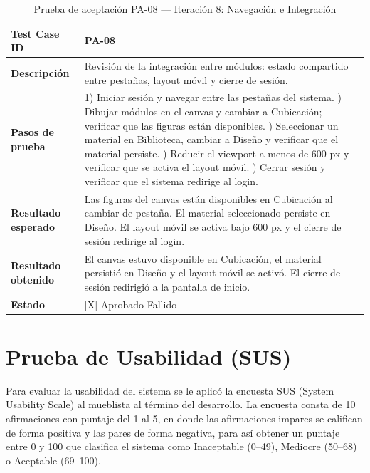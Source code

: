 ﻿\documentclass{iccmemoria}
\begin{document}
\begin{table}[H]
\centering
\caption{Prueba de aceptación PA-08 — Iteración 8: Navegación e Integración}
\label{tab:pa08}
\begin{tabular}{|p{4cm}|p{9.5cm}|}
\hline
\textbf{Test Case ID} & PA-08 \\
\hline
\textbf{Descripción} & Revisión de la integración entre módulos: estado compartido entre pestañas, layout móvil y cierre de sesión. \\
\hline
\textbf{Pasos de prueba} &
1) Iniciar sesión y navegar entre las pestañas del sistema. \newline
2) Dibujar módulos en el canvas y cambiar a Cubicación; verificar que las figuras están disponibles. \newline
3) Seleccionar un material en Biblioteca, cambiar a Diseño y verificar que el material persiste. \newline
4) Reducir el viewport a menos de 600 px y verificar que se activa el layout móvil. \newline
5) Cerrar sesión y verificar que el sistema redirige al login. \\
\hline
\textbf{Resultado esperado} & Las figuras del canvas están disponibles en Cubicación al cambiar de pestaña. El material seleccionado persiste en Diseño. El layout móvil se activa bajo 600 px y el cierre de sesión redirige al login. \\
\hline
\textbf{Resultado obtenido} & El canvas estuvo disponible en Cubicación, el material persistió en Diseño y el layout móvil se activó. El cierre de sesión redirigió a la pantalla de inicio. \\
\hline
\textbf{Estado} & {[X]} Aprobado \quad {[ ]} Fallido \\
\hline
\end{tabular}
\end{table}

\section{Prueba de Usabilidad (SUS)}
\label{sec:sus}
Para evaluar la usabilidad del sistema se le aplicó la encuesta SUS (System Usability Scale) al mueblista al término del desarrollo. La encuesta consta de 10 afirmaciones con puntaje del 1 al 5, en donde las afirmaciones impares se califican de forma positiva y las pares de forma negativa, para así obtener un puntaje entre 0 y 100 que clasifica el sistema como Inaceptable (0--49), Mediocre (50--68) o Aceptable (69--100).
\end{document}
